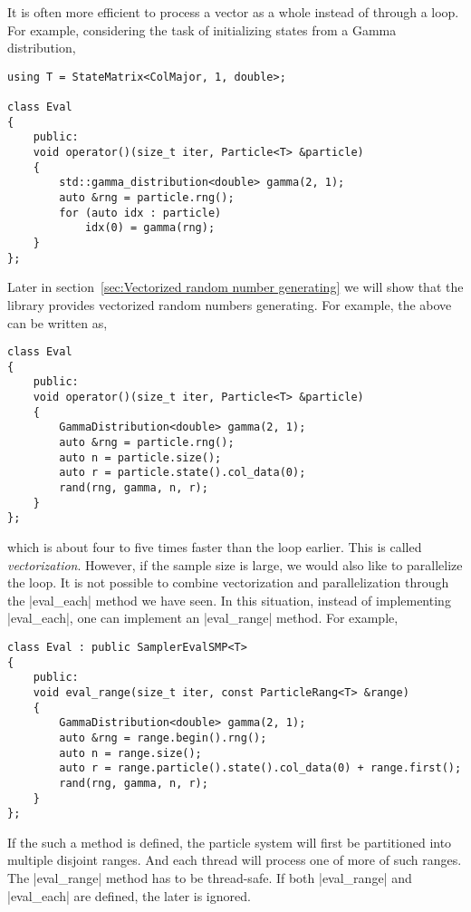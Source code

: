 It is often more efficient to process a vector as a whole instead of through a
loop. For example, considering the task of initializing states from a Gamma
distribution,
\begin{Verbatim}
using T = StateMatrix<ColMajor, 1, double>;

class Eval
{
    public:
    void operator()(size_t iter, Particle<T> &particle)
    {
        std::gamma_distribution<double> gamma(2, 1);
        auto &rng = particle.rng();
        for (auto idx : particle)
            idx(0) = gamma(rng);
    }
};
\end{Verbatim}
Later in section~\ref{sec:Vectorized random number generating} we will show
that the library provides vectorized random numbers generating. For example,
the above can be written as,
\begin{Verbatim}
class Eval
{
    public:
    void operator()(size_t iter, Particle<T> &particle)
    {
        GammaDistribution<double> gamma(2, 1);
        auto &rng = particle.rng();
        auto n = particle.size();
        auto r = particle.state().col_data(0);
        rand(rng, gamma, n, r);
    }
};
\end{Verbatim}
which is about four to five times faster than the loop earlier. This is called
\emph{vectorization}. However, if the sample size is large, we would also like
to parallelize the loop. It is not possible to combine vectorization and
parallelization through the |eval_each| method we have seen. In this situation,
instead of implementing |eval_each|, one can implement an |eval_range| method.
For example,
\begin{Verbatim}
class Eval : public SamplerEvalSMP<T>
{
    public:
    void eval_range(size_t iter, const ParticleRang<T> &range)
    {
        GammaDistribution<double> gamma(2, 1);
        auto &rng = range.begin().rng();
        auto n = range.size();
        auto r = range.particle().state().col_data(0) + range.first();
        rand(rng, gamma, n, r);
    }
};
\end{Verbatim}
If the such a method is defined, the particle system will first be partitioned
into multiple disjoint ranges. And each thread will process one of more of such
ranges. The |eval_range| method has to be thread-safe. If both |eval_range| and
|eval_each| are defined, the later is ignored.

